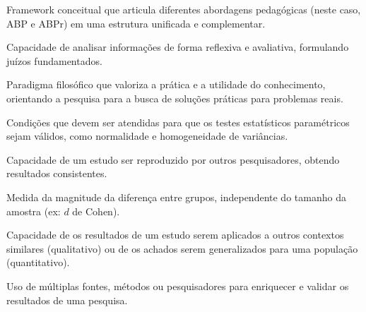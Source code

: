 \documentclass[12pt,a4paper,twoside,openright]{book}
\begin{document}
\begin{description}[style=nextline]
\item[Modelo integrador] Framework conceitual que articula diferentes abordagens pedagógicas (neste caso, ABP e ABPr) em uma estrutura unificada e complementar.

\item[Pensamento crítico] Capacidade de analisar informações de forma reflexiva e avaliativa, formulando juízos fundamentados.

\item[Pragmatismo] Paradigma filosófico que valoriza a prática e a utilidade do conhecimento, orientando a pesquisa para a busca de soluções práticas para problemas reais.

\item[Pressupostos estatísticos] Condições que devem ser atendidas para que os testes estatísticos paramétricos sejam válidos, como normalidade e homogeneidade de variâncias.

\item[Replicabilidade] Capacidade de um estudo ser reproduzido por outros pesquisadores, obtendo resultados consistentes.

\item[Tamanho do efeito] Medida da magnitude da diferença entre grupos, independente do tamanho da amostra (ex: $d$ de Cohen).

\item[Transferibilidade] Capacidade de os resultados de um estudo serem aplicados a outros contextos similares (qualitativo) ou de os achados serem generalizados para uma população (quantitativo).

\item[Triangulação] Uso de múltiplas fontes, métodos ou pesquisadores para enriquecer e validar os resultados de uma pesquisa.
\end{description}

\newpage

\tableofcontents
\newpage

\mainmatter
\pagestyle{fancy}








\end{document}
